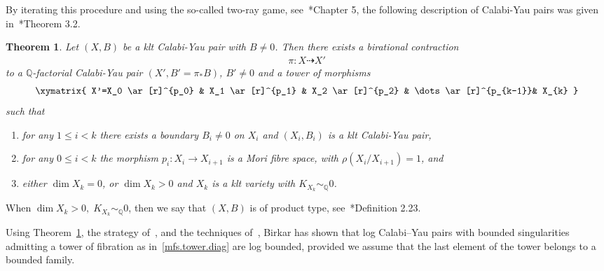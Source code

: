 \documentclass[11pt]{ip-journal}
\newtheorem{theorem}{Theorem}[section]
\theoremstyle{definition}
\begin{document}
By iterating this procedure and using the so-called two-ray game, see~\cite{MR1225842}*{Chapter 5}, the following description of Calabi-Yau pairs was given in~\cite{DCS}*{Theorem 3.2}.
\begin{theorem} 
\label{structure}
Let $(X, B)$ be a klt Calabi-Yau pair with $B \neq 0$. 
Then there exists a birational contraction 
\begin{align*}
		\pi \colon X \dashrightarrow X'
\end{align*}
to a $\mathbb{Q}$-factorial Calabi-Yau pair $(X', B' =\pi_\ast B)$, $B'\neq 0$ and a tower of morphisms
\begin{align}
\label{mfs.tower.diag}
\xymatrix{
			X'=X_0 \ar[r]^{p_0} & 
			X_1 \ar[r]^{p_1} & 
			X_2 \ar[r]^{p_2} &
			\dots \ar[r]^{p_{k-1}}& 
			X_{k}
}
\end{align}		
\noindent such that 
\begin{enumerate}
		\item[(i)] 
for any $1 \leq i < k$ there exists a boundary $B_i \neq 0$ on $X_i$ and $(X_i, B_i)$ is a klt Calabi-Yau pair,

 		\item[(ii)] 
for any $0 \leq i < k$ the morphism $p_i\colon X_i \to X_{i+1}$ is a Mori fibre space, with $\rho(X_i/X_{i+1})=1$, and

		\item[(iii)]  
either $\dim X_k=0$, or $\dim X_k >0$ and $X_k$ is a klt variety with $K_{X_k} \sim_\mathbb{Q} 0$.
\end{enumerate}		
\end{theorem}

When $\dim X_k >0, \; K_{X_k} \sim_\mathbb{Q} 0$, then we say that $(X, B)$ is of product type, see~\cite{DCS}*{Definition 2.23}.


Using Theorem~\ref{structure}, the strategy of~\cite{DCS}, and the techniques of~\cites{Bir16a, Bir16b}, Birkar has shown that log Calabi--Yau pairs with bounded singularities admitting a tower of fibration as in~\eqref{mfs.tower.diag} are log bounded, provided we assume that the last element of the tower belongs to a bounded family.
\end{document}
